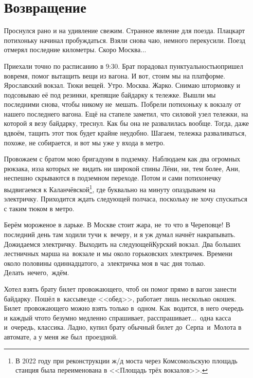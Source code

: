 \chapter{Возвращение}
\vepsianrose

Проснулся рано и на удивление свежим. Странное явление для поезда. Плацкарт потихоньку начинал пробуждаться. Взяли снова чаю, немного перекусили. Поезд отмерял последние километры. Скоро Москва$\ldots$

Приехали точно по расписанию в 9:30. Брат порадовал пунктуальностью\mdash пришел вовремя, помог вытащить вещи из вагона. И вот, стоим мы на платформе. Ярославский вокзал. Тюки вещей. Утро. Москва. Жарко. Снимаю штормовку и подсовываю её под резинки, крепящие байдарку к тележке. Вышли мы последними снова, чтобы никому не~мешать. Побрели потихоньку к вокзалу от нашего последнего вагона. Ещё на стапеле заметил, что силовой узел тележки, на которой я везу байдарку, треснул. Как бы она не развалилась вообще. Тогда, даже вдвоём, тащить этот тюк будет крайне неудобно. Шагаем, тележка разваливаться, похоже, не собирается, и вот мы уже у входа в метро. 

\newpage
Провожаем с братом мою бригаду\mdash им в подземку. Наблюдаем как два огромных рюкзака, из\sdash за которых не~видать ни широкой спины Лёни, ни, тем более, Ани, неспешно скрываются в подземном переходе. Потом и сами потихонечку выдвигаемся к Каланчёвской\footnote{В 2022 году при реконструкции ж/д моста через Комсомольскую площадь станция была переименована в <<Площадь трёх вокзалов>>.}, где буквально на минуту опаздываем на электричку. Приходится ждать следующей полчаса, поскольку не хочу спускаться с таким тюком в метро.

Берём мороженое в ларьке. В Москве стоит жара, не~то что в Череповце! В последний день там ходили тучи к~вечеру, и я уж думал начнёт накрапывать. Дожидаемся электричку. Выходить на следующей\mdash Курский вокзал. Два больших лестничных марша на~вокзале и мы около горьковских электричек. Времени около половины одиннадцатого, а~электричка моя в час дня только. Делать~нечего,~ждём.

Хотел взять брату билет провожающего, чтоб он помог прямо в вагон занести байдарку. Пошёл в~кассы\mdash везде <<обед>>, работает лишь несколько окошек. Билет~провожающего можно взять только в~одном. Как~водится, в него очередь и каждый что\sdash то безумно медленно спрашивает, расспрашивает$\ldots$~одна касса и~очередь, классика. Ладно, купил брату обычный билет до~Серпа~и~Молота в автомате, а у меня же был~проездной. 

